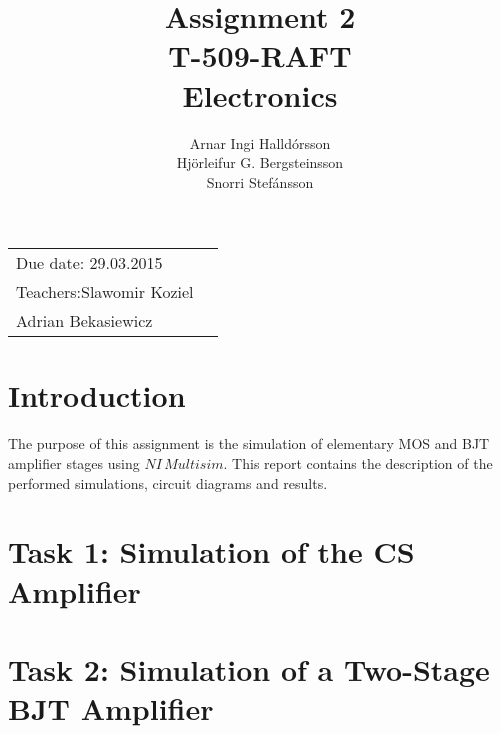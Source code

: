 \documentclass[11pt,a4paper]{article}
\title{Assignment 2 \\ T-509-RAFT \\ Electronics} %
\author{Arnar Ingi Halldórsson \\ Hjörleifur G. Bergsteinsson \\ Snorri Stefánsson} %
\begin{document}
\maketitle %

\begin{tabular}{lr}
    Due date: 29.03.2015 \\
    Teachers:\qquad Slawomir Koziel\\ %
\qquad \qquad \qquad Adrian Bekasiewicz
\end{tabular}

\setlength\parindent{0pt} %

\renewcommand{\labelenumi}{\alph{enumi}.} %

\section*{Introduction}

    The  purpose  of  this  assignment  is  the  simulation  of  elementary  MOS  and  BJT  amplifier stages using $NI \, Multisim$. This report contains the description of the performed simulations, circuit diagrams and results.

\pagebreak

\section*{Task 1: Simulation of the CS Amplifier}
    
\pagebreak
\section*{Task 2: Simulation of a Two-Stage BJT Amplifier}
    
\end{document}

